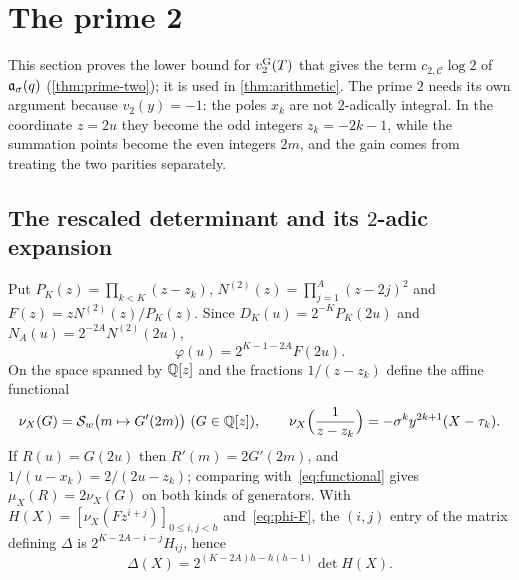 \section{The prime 2}\label{sec:prime-two}

This section proves the lower bound for $v_{2}^{\mathrm{G}}(T)$ that gives the term $c_{2,\mathcal C}\log2$
of $\mathfrak{a}_\sigma(q)$ (\cref{thm:prime-two}); it is used in \cref{thm:arithmetic}. The prime $2$
needs its own argument because $v_2(y)=-1$: the poles $x_k$ are not $2$-adically integral. In the
coordinate $z=2u$ they become the odd integers $z_k=-2k-1$, while the summation points become the
even integers $2m$, and the gain comes from treating the two parities separately.

\subsection{The rescaled determinant and its \texorpdfstring{$2$}{2}-adic expansion}\label{subsec:rescaled}

Put $P_K(z)=\prod_{k<K}(z-z_k)$, $N^{(2)}(z)=\prod_{j=1}^A(z-2j)^2$ and $F(z)=zN^{(2)}(z)/P_K(z)$.
Since $D_K(u)=2^{-K}P_K(2u)$ and $N_A(u)=2^{-2A}N^{(2)}(2u)$,
\begin{equation}\label{eq:phi-F}
  \varphi(u)=2^{K-1-2A}F(2u).
\end{equation}
On the space spanned by $\mathbb{Q}[z]$ and the fractions $1/(z-z_k)$ define the affine functional
\[
  \nu_X(G)=\mom\bigl(m\mapsto G'(2m)\bigr)\ (G\in\Q[z]),\qquad
  \nu_X\Bigl(\frac1{z-z_k}\Bigr)=-\sigma^ky^{2k+1}(X-\tau_k).
\]
If $R(u)=G(2u)$ then $R'(m)=2G'(2m)$, and $1/(u-x_k)=2/(2u-z_k)$; comparing
with~\eqref{eq:functional} gives $\mu_X(R)=2\nu_X(G)$ on both kinds of generators. With
$H(X)=[\nu_X(Fz^{i+j})]_{0\le i,j<h}$ and~\eqref{eq:phi-F}, the $(i,j)$ entry of the matrix
defining $\Delta$ is $2^{K-2A-i-j}H_{ij}$, hence
\begin{equation}\label{eq:Delta-H}
  \Delta(X)=2^{(K-2A)h-h(h-1)}\det H(X).
\end{equation}

